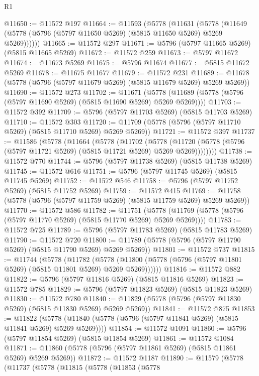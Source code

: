 \begin{lexlean}{R1}
\begin{coremodule}
@11650 := @11572 @197
@11664 := @11593
    (@5778
      (@11631
        (@5778 (@11649 (@5778 (@5796 (@5797 @11650 @5269) (@5815 @11650 @5269) @5269 @5269))))))
@11665 := @11572 @297
@11671 := @5796 (@5797 @11665 @5269) (@5815 @11665 @5269)
@11672 := @11572 @259
@11673 := @5797 @11672
@11674 := @11673 @5269
@11675 := @5796 @11674
@11677 := @5815 @11672 @5269
@11678 := @11675 @11677
@11679 := @11572 @231
@11689 := @11678 (@5778 (@5796 (@5797 @11679 @5269) (@5815 @11679 @5269) @5269 @5269))
@11690 := @11572 @273
@11702 := @11671
    (@5778 (@11689 (@5778 (@5796 (@5797 @11690 @5269) (@5815 @11690 @5269) @5269 @5269))))
@11703 := @11572 @392
@11709 := @5796 (@5797 @11703 @5269) (@5815 @11703 @5269)
@11710 := @11572 @303
@11720 := @11709 (@5778 (@5796 (@5797 @11710 @5269) (@5815 @11710 @5269) @5269 @5269))
@11721 := @11572 @397
@11737 := @11586
    (@5778
      (@11664
        (@5778
          (@11702
            (@5778
              (@11720 (@5778 (@5796 (@5797 @11721 @5269) (@5815 @11721 @5269) @5269 @5269))))))))
@11738 := @11572 @770
@11744 := @5796 (@5797 @11738 @5269) (@5815 @11738 @5269)
@11745 := @11572 @616
@11751 := @5796 (@5797 @11745 @5269) (@5815 @11745 @5269)
@11752 := @11572 @546
@11758 := @5796 (@5797 @11752 @5269) (@5815 @11752 @5269)
@11759 := @11572 @415
@11769 := @11758 (@5778 (@5796 (@5797 @11759 @5269) (@5815 @11759 @5269) @5269 @5269))
@11770 := @11572 @586
@11782 := @11751
    (@5778 (@11769 (@5778 (@5796 (@5797 @11770 @5269) (@5815 @11770 @5269) @5269 @5269))))
@11783 := @11572 @725
@11789 := @5796 (@5797 @11783 @5269) (@5815 @11783 @5269)
@11790 := @11572 @720
@11800 := @11789 (@5778 (@5796 (@5797 @11790 @5269) (@5815 @11790 @5269) @5269 @5269))
@11801 := @11572 @737
@11815 := @11744
    (@5778
      (@11782
        (@5778 (@11800 (@5778 (@5796 (@5797 @11801 @5269) (@5815 @11801 @5269) @5269 @5269))))))
@11816 := @11572 @882
@11822 := @5796 (@5797 @11816 @5269) (@5815 @11816 @5269)
@11823 := @11572 @785
@11829 := @5796 (@5797 @11823 @5269) (@5815 @11823 @5269)
@11830 := @11572 @780
@11840 := @11829 (@5778 (@5796 (@5797 @11830 @5269) (@5815 @11830 @5269) @5269 @5269))
@11841 := @11572 @875
@11853 := @11822
    (@5778 (@11840 (@5778 (@5796 (@5797 @11841 @5269) (@5815 @11841 @5269) @5269 @5269))))
@11854 := @11572 @1091
@11860 := @5796 (@5797 @11854 @5269) (@5815 @11854 @5269)
@11861 := @11572 @1084
@11871 := @11860 (@5778 (@5796 (@5797 @11861 @5269) (@5815 @11861 @5269) @5269 @5269))
@11872 := @11572 @1187
@11890 := @11579
    (@5778
      (@11737
        (@5778
          (@11815
            (@5778
              (@11853
                (@5778

\end{coremodule}
\end{lexlean}
